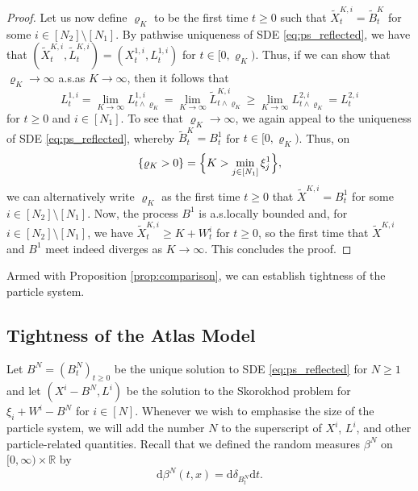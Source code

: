 \documentclass[11pt, a4paper]{article}
\theoremstyle{plain}
\theoremstyle{definition}
\theoremstyle{remark}
\numberwithin{equation}{section}
\newcommand{\R}{\mathbb{R}}
\renewcommand{\d}{\mathrm{d}}
\begin{document}
\begin{proof}
Let us now define $\varrho_K$ to be the first time $t \geq 0$ such that $\tilde{X}^{K, i}_t = \tilde{B}^K_t$ for some $i \in [N_2] \setminus [N_1]$. By pathwise uniqueness of SDE \eqref{eq:ps_reflected}, we have that $(\tilde{X}^{K, i}_t, \tilde{L}^{K, i}_t) = (X^{1, i}_t, L^{1, i}_t)$ for $t \in [0, \varrho_K)$. Thus, if we can show that $\varrho_K \to \infty$ a.s.\@ as $K \to \infty$, then it follows that
\begin{equation*}
    L^{1, i}_t = \lim_{K \to \infty} L^{1, i}_{t \land \varrho_K} = \lim_{K \to \infty} \tilde{L}^{K, i}_{t \land \varrho_K} \geq \lim_{K \to \infty} L^{2, i}_{t \land \varrho_K} = L^{2, i}_t
\end{equation*}
for $t \geq 0$ and $i \in [N_1]$. To see that $\varrho_K \to \infty$, we again appeal to the uniqueness of SDE \eqref{eq:ps_reflected}, whereby $\tilde{B}^K_t = B^1_t$ for $t \in [0, \varrho_K)$. Thus, on
\begin{equation*}
    \{\varrho_K > 0\} = \Bigl\{K > \min_{j \in [N_1]} \xi^1_j\Bigr\},
\end{equation*}
we can alternatively write $\varrho_K$ as the first time $t \geq 0$ that $\tilde{X}^{K, i} = B^1_t$ for some $i \in [N_2] \setminus [N_1]$. Now, the process $B^1$ is a.s.\@ locally bounded and, for $i \in [N_2] \setminus [N_1]$, we have $\tilde{X}^{K, i}_t \geq K + W^i_t$ for $t \geq 0$, so the first time that $\tilde{X}^{K, i}$ and $B^1$ meet indeed diverges as $K \to \infty$. This concludes the proof.
\end{proof}

Armed with Proposition \ref{prop:comparison}, we can establish tightness of the particle system.

\subsection{Tightness of the Atlas Model} \label{sec:tightness}

Let $B^N = (B^N_t)_{t \geq 0}$ be the unique solution to SDE \eqref{eq:ps_reflected} for $N \geq 1$ and let $(X^i - B^N, L^i)$ be the solution to the Skorokhod problem for $\xi_i + W^i - B^N$ for $i \in [N]$. Whenever we wish to emphasise the size of the particle system, we will add the number $N$ to the superscript of $X^i$, $L^i$, and other particle-related quantities. Recall that we defined the random measures $\beta^N$ on $[0, \infty) \times \R$ by
\begin{equation*}
    \d \beta^N(t, x) = \d \delta_{B^N_t} \d t.
\end{equation*}
\end{document}
